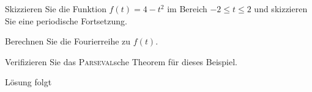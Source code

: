 \documentclass{atistandalonetask}
\begin{document}
  \begin{atiTask}[
    title = Periodische Fortsetzung
  ]


	\begin{atiSubtasks}
		\item Skizzieren Sie die Funktion $f(t)=4-t^2$ im Bereich $-2\leq t\leq 2$ und skizzieren Sie eine periodische Fortsetzung.
		\item Berechnen Sie die Fourierreihe zu $f(t)$.
		\item Verifizieren Sie das \textsc{Parseval}sche Theorem für dieses Beispiel.
	\end{atiSubtasks} 
	\atiNote{\[\sum _{n=1}^\infty\frac{1}{n^4}=\frac{\pi^4}{90}\]}
  \end{atiTask}
  \begin{atiSolution}
  Lösung folgt
  \end{atiSolution}
\end{document}
